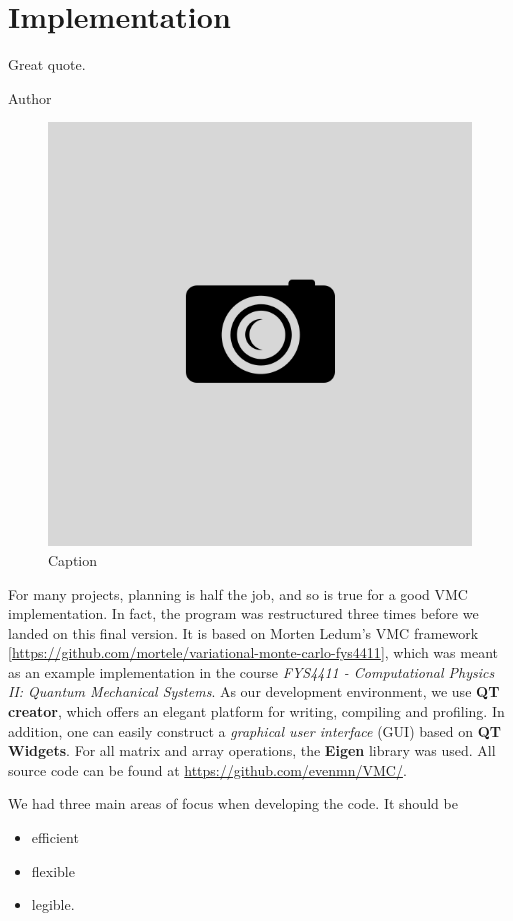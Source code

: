 \chapter{Implementation} \label{sec:implementation}
\epigraph{Great quote.}{Author}
\begin{figure}[H]
	\centering
	\includegraphics[scale=0.4]{Images/example.png}
	\caption{Caption}
\end{figure}

For many projects, planning is half the job, and so is true for a good VMC implementation. In fact, the program was restructured three times before we landed on this final version. It is based on Morten Ledum's VMC framework [\url{https://github.com/mortele/variational-monte-carlo-fys4411}], which was meant as an example implementation in the course \textit{FYS4411 - Computational Physics II: Quantum Mechanical Systems}. As our development environment, we use \textbf{QT creator}, which offers an elegant platform for writing, compiling and profiling. In addition, one can easily construct a \textit{graphical user interface} (GUI) based on \textbf{QT Widgets}. For all matrix and array operations, the \textbf{Eigen} library was used. All source code can be found at \url{https://github.com/evenmn/VMC/}. \bigskip

We had three main areas of focus when developing the code. It should be
\begin{itemize}
	\itemsep-0.3em
	\item efficient
	\item flexible
	\item legible.
\end{itemize}

